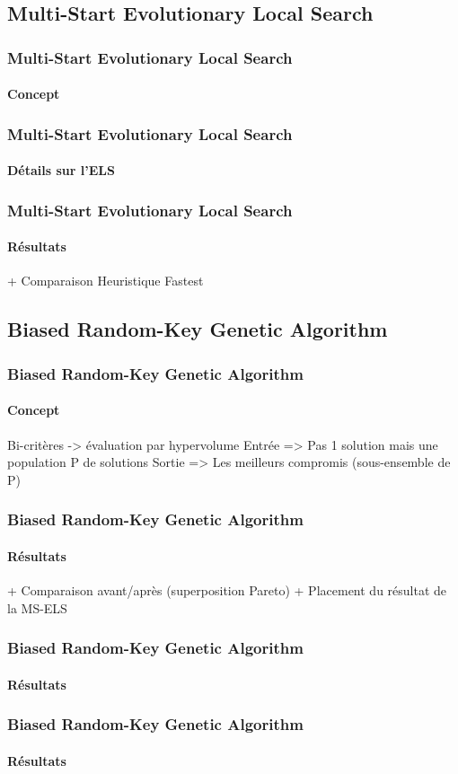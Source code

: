 \subsection{Multi-Start Evolutionary Local Search}
\begin{frame}
	\frametitle{Multi-Start Evolutionary Local Search}
	\framesubtitle{Concept}
\end{frame}
\begin{frame}
	\frametitle{Multi-Start Evolutionary Local Search}
	\framesubtitle{Détails sur l'ELS}
	\begin{tikzpicture}[scale=.5,transform shape,node distance=1cm]
		
	\end{tikzpicture}
\end{frame}
\begin{frame}
	\frametitle{Multi-Start Evolutionary Local Search}
	\framesubtitle{Résultats}
	+ Comparaison Heuristique Fastest
\end{frame}

\subsection{Biased Random-Key Genetic Algorithm}
\begin{frame}
	\frametitle{Biased Random-Key Genetic Algorithm}
	\framesubtitle{Concept}
	Bi-critères -> évaluation par hypervolume
	Entrée => Pas 1 solution mais une population P de solutions
	Sortie => Les meilleurs compromis (sous-ensemble de P)
\end{frame}
\begin{frame}
	\frametitle{Biased Random-Key Genetic Algorithm}
	\framesubtitle{Résultats}
	+ Comparaison avant/après (superposition Pareto)
	+ Placement du résultat de la MS-ELS
\end{frame}
\begin{frame}
	\frametitle{Biased Random-Key Genetic Algorithm}
	\framesubtitle{Résultats}
	
\end{frame}
\begin{frame}
	\frametitle{Biased Random-Key Genetic Algorithm}
	\framesubtitle{Résultats}
	
\end{frame}
